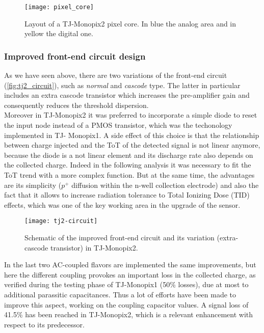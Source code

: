 \begin{figure}[h!]
\centering
\texttt{[image: pixel\_core]}
\caption{Layout of a TJ-Monopix2  pixel core. In blue the analog area and in yellow the digital one.}
\label{fig:tj2core}
\end{figure}



\subsubsection{Improved front-end circuit design}\label{sec:improved_circuit}

As we have seen above, there are two variations of the front-end circuit (\autoref{fig:tj2_circuit}), such as \textit{normal} and \textit{cascode} type. The latter in particular includes an extra cascode transistor which increases the pre-amplifier gain and consequently reduces the threshold dispersion.\\
Moreover in TJ-Monopix2 it was preferred to incorporate a simple diode to reset the input node instead of a PMOS transistor, which was the techonology implemented in TJ- Monopix1. A side effect of this choice is that the relationship between charge injected and the ToT of the detected signal is not linear anymore, because the diode is a not linear element and its discharge rate also depends on the collected charge. Indeed in the following analysis it was necessary to fit the ToT trend with a more complex function. But at the same time, the advantages are its simplicity ($p^{+}$ diffusion within the n-well collection electrode) and also the fact that it allows to increase radiation tolerance to Total Ionizing Dose (TID) effects, which was one of the key working area in the upgrade of the sensor.


\begin{figure}[h!]
\centering
\texttt{[image: tj2-circuit]}
\caption{Schematic of the improved front-end circuit and its variation (extra-cascode transistor) in TJ-Monopix2.}
\label{fig:tj2_circuit}
\end{figure}


In the last two AC-coupled flavors are implemented the same improvements, but here the different coupling provokes an important loss in the collected charge, as verified during the testing phase of TJ-Monopix1 (50\% losses), due at most to additional parassitic capacitances. Thus a lot of efforts have been made to improve this aspect, working on the coupling capacitor values. A signal loss of 41.5\% has been reached in TJ-Monopix2, which is a relevant enhancement with respect to its predecessor.




